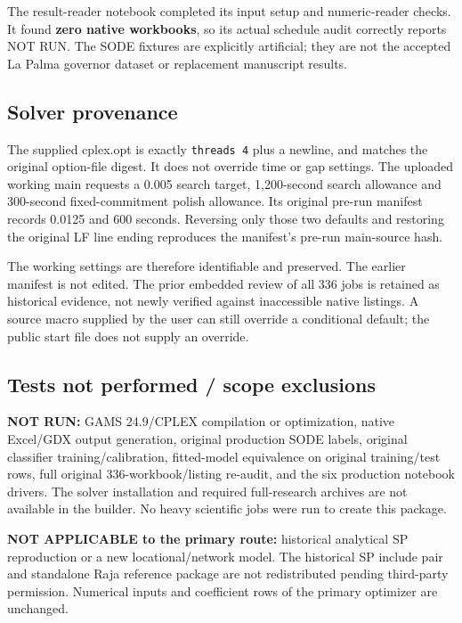 \documentclass[
  11pt,
  a4paper,
]{article}
\begin{document}
The result-reader notebook completed its input setup and numeric-reader
checks. It found \textbf{zero native workbooks}, so its actual schedule
audit correctly reports NOT RUN. The SODE fixtures are explicitly
artificial; they are not the accepted La Palma governor dataset or
replacement manuscript results.

\subsection{Solver provenance}\label{solver-provenance}

The supplied cplex.opt is exactly \texttt{threads\ 4} plus a newline,
and matches the original option-file digest. It does not override time
or gap settings. The uploaded working main requests a 0.005 search
target, 1,200-second search allowance and 300-second fixed-commitment
polish allowance. Its original pre-run manifest records 0.0125 and 600
seconds. Reversing only those two defaults and restoring the original LF
line ending reproduces the manifest's pre-run main-source hash.

The working settings are therefore identifiable and preserved. The
earlier manifest is not edited. The prior embedded review of all 336
jobs is retained as historical evidence, not newly verified against
inaccessible native listings. A source macro supplied by the user can
still override a conditional default; the public start file does not
supply an override.

\subsection{Tests not performed / scope
exclusions}\label{tests-not-performed-scope-exclusions}

\textbf{NOT RUN:} GAMS 24.9/CPLEX compilation or optimization, native
Excel/GDX output generation, original production SODE labels, original
classifier training/calibration, fitted-model equivalence on original
training/test rows, full original 336-workbook/listing re-audit, and the
six production notebook drivers. The solver installation and required
full-research archives are not available in the builder. No heavy
scientific jobs were run to create this package.

\textbf{NOT APPLICABLE to the primary route:} historical analytical SP
reproduction or a new locational/network model. The historical SP
include pair and standalone Raja reference package are not redistributed
pending third-party permission. Numerical inputs and coefficient rows of
the primary optimizer are unchanged.
\end{document}
